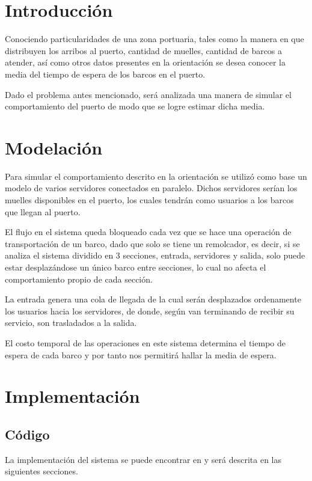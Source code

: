 

\section{Introducci\'on}
	Conociendo particularidades de una zona portuaria, tales como la manera
	en que distribuyen los arribos al puerto, cantidad de muelles, cantidad de
	barcos a atender, as\'i como otros datos presentes en la orientaci\'on \cite{order}
	se desea conocer la media del tiempo de espera de los barcos en el puerto.

	Dado el problema antes mencionado, ser\'a analizada una manera de simular
	el comportamiento del puerto de modo que se logre estimar dicha media.

\section{Modelaci\'on}
	Para simular el comportamiento descrito en la orientaci\'on se utiliz\'o como
	base un modelo de varios servidores conectados en paralelo. Dichos servidores
	ser\'ian los muelles disponibles en el puerto, los cuales tendr\'an como usuarios 
	a los barcos que llegan al puerto. 
	
	El flujo en el sistema queda bloqueado cada vez que se hace una operaci\'on de 
	transportaci\'on de un barco, dado que solo se tiene un remolcador, es decir, si se 
	analiza el sistema dividido en 3 secciones, entrada, servidores y salida, solo puede 
	estar desplaz\'andose un \'unico barco entre secciones, lo cual no afecta el comportamiento
	propio de cada secci\'on.
	
	La entrada genera una cola de llegada de la cual ser\'an desplazados ordenamente los
	usuarios hacia los servidores, de donde, seg\'un van terminando de recibir su servicio,
	son trasladados a la salida. 
	
	El costo temporal de las operaciones en este sistema determina el tiempo de espera 
	de cada barco y por tanto nos permitir\'a hallar la media de espera.

\section{Implementaci\'on}
	\subsection{C\'odigo}
		La implementaci\'on del sistema se puede encontrar en \cite{repo} y ser\'a descrita
		en las siguientes secciones.

